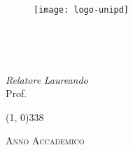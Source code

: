 \begin{titlepage}

\begin{center}

\begin{LARGE}
\textbf{\myUni}\\
\end{LARGE}

\vspace{10pt}

\begin{Large}
\textsc{\myDepartment}\\
\end{Large}

\vspace{10pt}

\begin{large}
\textsc{\myFaculty}\\
\end{large}

\vspace{10pt}
\begin{figure}[htbp]
\begin{center}
\texttt{[image: logo-unipd]}
\end{center}
\end{figure}
\vspace{25pt} 

\begin{LARGE}
\begin{center}
\textbf{\myTitle}\\
\end{center}
\end{LARGE}

\vspace{10pt} 

\begin{LARGE}
\textsl{\myDegree}\\
\end{LARGE}

\vfill

\begin{Large}
\textit{Relatore} \hfill \textit{Laureando}\\ 
\vspace{5pt} 
Prof. \myProf \hfill \myName 
\end{Large}

\vspace{30pt}

\line(1, 0){338} \\
\begin{large}
\textsc{Anno Accademico \myAA}
\end{large}

\end{center}
\end{titlepage} 